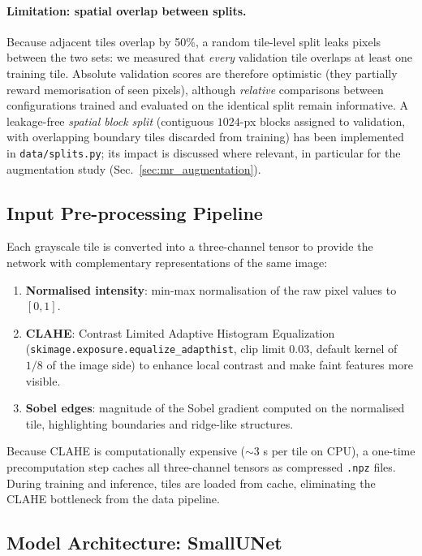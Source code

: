 \documentclass{aa}
\begin{document}
\paragraph{Limitation: spatial overlap between splits.}
Because adjacent tiles overlap by 50\%, a random tile-level split leaks pixels between the two sets: we measured that \emph{every} validation tile overlaps at least one training tile. Absolute validation scores are therefore optimistic (they partially reward memorisation of seen pixels), although \emph{relative} comparisons between configurations trained and evaluated on the identical split remain informative. A leakage-free \emph{spatial block split} (contiguous $1024$-px blocks assigned to validation, with overlapping boundary tiles discarded from training) has been implemented in \texttt{data/splits.py}; its impact is discussed where relevant, in particular for the augmentation study (Sec.~\ref{sec:mr_augmentation}).

\subsection{Input Pre-processing Pipeline}
\label{sec:mr_preprocessing}

Each grayscale tile is converted into a three-channel tensor to provide the network with complementary representations of the same image:

\begin{enumerate}
    \item \textbf{Normalised intensity}: min-max normalisation of the raw pixel values to $[0,1]$.
    \item \textbf{CLAHE}: Contrast Limited Adaptive Histogram Equalization (\texttt{skimage.exposure.equalize\_adapthist}, clip limit $0.03$, default kernel of $1/8$ of the image side) to enhance local contrast and make faint features more visible.
    \item \textbf{Sobel edges}: magnitude of the Sobel gradient computed on the normalised tile, highlighting boundaries and ridge-like structures.
\end{enumerate}

\noindent
Because CLAHE is computationally expensive (${\sim}3$ s per tile on CPU), a one-time precomputation step caches all three-channel tensors as compressed \texttt{.npz} files. During training and inference, tiles are loaded from cache, eliminating the CLAHE bottleneck from the data pipeline.

\subsection{Model Architecture: SmallUNet}
\label{sec:mr_architecture}
\end{document}
